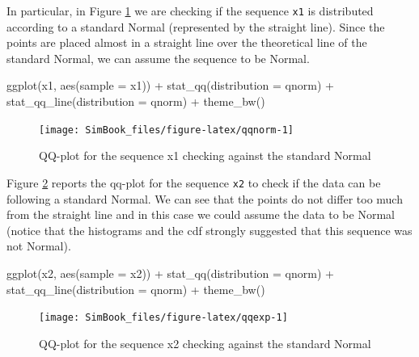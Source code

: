 \documentclass[
]{book}
\newenvironment{Shaded}{\begin{snugshade}}{\end{snugshade}}
\newcommand{\AttributeTok}[1]{\textcolor[rgb]{0.77,0.63,0.00}{#1}}
\newcommand{\FunctionTok}[1]{\textcolor[rgb]{0.00,0.00,0.00}{#1}}
\newcommand{\NormalTok}[1]{#1}
\newcommand{\SpecialCharTok}[1]{\textcolor[rgb]{0.00,0.00,0.00}{#1}}
\begin{document}
In particular, in Figure \ref{fig:qqnorm} we are checking if the sequence \texttt{x1} is distributed according to a standard Normal (represented by the straight line). Since the points are placed almost in a straight line over the theoretical line of the standard Normal, we can assume the sequence to be Normal.

\begin{Shaded}
\begin{Highlighting}[]
\FunctionTok{ggplot}\NormalTok{(x1, }\FunctionTok{aes}\NormalTok{(}\AttributeTok{sample =}\NormalTok{ x1)) }\SpecialCharTok{+}
   \FunctionTok{stat\_qq}\NormalTok{(}\AttributeTok{distribution =}\NormalTok{ qnorm) }\SpecialCharTok{+}
   \FunctionTok{stat\_qq\_line}\NormalTok{(}\AttributeTok{distribution =}\NormalTok{ qnorm) }\SpecialCharTok{+}
   \FunctionTok{theme\_bw}\NormalTok{()}
\end{Highlighting}
\end{Shaded}

\begin{figure}

{\centering \texttt{[image: SimBook\_files/figure-latex/qqnorm-1]} 

}

\caption{QQ-plot for the sequence x1 checking against the standard Normal}\label{fig:qqnorm}
\end{figure}

Figure \ref{fig:qqexp} reports the qq-plot for the sequence \texttt{x2} to check if the data can be following a standard Normal. We can see that the points do not differ too much from the straight line and in this case we could assume the data to be Normal (notice that the histograms and the cdf strongly suggested that this sequence was not Normal).

\begin{Shaded}
\begin{Highlighting}[]
\FunctionTok{ggplot}\NormalTok{(x2, }\FunctionTok{aes}\NormalTok{(}\AttributeTok{sample =}\NormalTok{ x2)) }\SpecialCharTok{+}
   \FunctionTok{stat\_qq}\NormalTok{(}\AttributeTok{distribution =}\NormalTok{ qnorm) }\SpecialCharTok{+}
   \FunctionTok{stat\_qq\_line}\NormalTok{(}\AttributeTok{distribution =}\NormalTok{ qnorm) }\SpecialCharTok{+}
   \FunctionTok{theme\_bw}\NormalTok{()}
\end{Highlighting}
\end{Shaded}

\begin{figure}

{\centering \texttt{[image: SimBook\_files/figure-latex/qqexp-1]} 

}

\caption{QQ-plot for the sequence x2 checking against the standard Normal}\label{fig:qqexp}
\end{figure}
\end{document}
